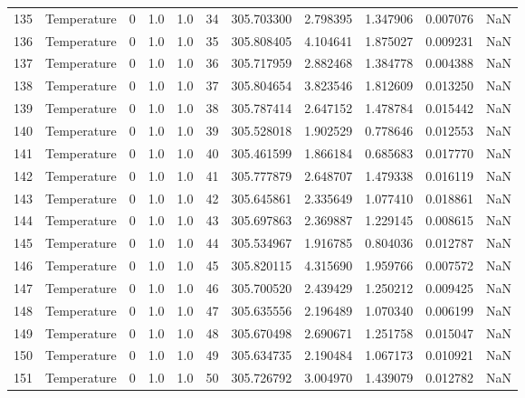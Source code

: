 \begin{tabular}{llrrrrrrrrr}
135 &  Temperature &       0 &  1.0 &  1.0 &   34 &  305.703300 &  2.798395 &  1.347906 &   0.007076 &      NaN \\
136 &  Temperature &       0 &  1.0 &  1.0 &   35 &  305.808405 &  4.104641 &  1.875027 &   0.009231 &      NaN \\
137 &  Temperature &       0 &  1.0 &  1.0 &   36 &  305.717959 &  2.882468 &  1.384778 &   0.004388 &      NaN \\
138 &  Temperature &       0 &  1.0 &  1.0 &   37 &  305.804654 &  3.823546 &  1.812609 &   0.013250 &      NaN \\
139 &  Temperature &       0 &  1.0 &  1.0 &   38 &  305.787414 &  2.647152 &  1.478784 &   0.015442 &      NaN \\
140 &  Temperature &       0 &  1.0 &  1.0 &   39 &  305.528018 &  1.902529 &  0.778646 &   0.012553 &      NaN \\
141 &  Temperature &       0 &  1.0 &  1.0 &   40 &  305.461599 &  1.866184 &  0.685683 &   0.017770 &      NaN \\
142 &  Temperature &       0 &  1.0 &  1.0 &   41 &  305.777879 &  2.648707 &  1.479338 &   0.016119 &      NaN \\
143 &  Temperature &       0 &  1.0 &  1.0 &   42 &  305.645861 &  2.335649 &  1.077410 &   0.018861 &      NaN \\
144 &  Temperature &       0 &  1.0 &  1.0 &   43 &  305.697863 &  2.369887 &  1.229145 &   0.008615 &      NaN \\
145 &  Temperature &       0 &  1.0 &  1.0 &   44 &  305.534967 &  1.916785 &  0.804036 &   0.012787 &      NaN \\
146 &  Temperature &       0 &  1.0 &  1.0 &   45 &  305.820115 &  4.315690 &  1.959766 &   0.007572 &      NaN \\
147 &  Temperature &       0 &  1.0 &  1.0 &   46 &  305.700520 &  2.439429 &  1.250212 &   0.009425 &      NaN \\
148 &  Temperature &       0 &  1.0 &  1.0 &   47 &  305.635556 &  2.196489 &  1.070340 &   0.006199 &      NaN \\
149 &  Temperature &       0 &  1.0 &  1.0 &   48 &  305.670498 &  2.690671 &  1.251758 &   0.015047 &      NaN \\
150 &  Temperature &       0 &  1.0 &  1.0 &   49 &  305.634735 &  2.190484 &  1.067173 &   0.010921 &      NaN \\
151 &  Temperature &       0 &  1.0 &  1.0 &   50 &  305.726792 &  3.004970 &  1.439079 &   0.012782 &      NaN \\

\end{tabular}
